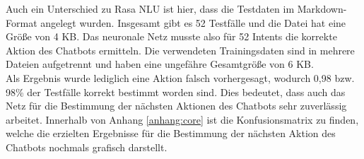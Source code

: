 Auch ein Unterschied zu Rasa NLU ist hier, dass die Testdaten im Markdown-Format angelegt wurden. Insgesamt gibt es 52 Testfälle und die Datei hat eine Größe von 4 KB. Das neuronale Netz musste also für 52 Intents die korrekte Aktion des Chatbots ermitteln. Die verwendeten Trainingsdaten sind in mehrere Dateien aufgetrennt und haben eine ungefähre Gesamtgröße von 6 KB.\\
Als Ergebnis wurde lediglich eine Aktion falsch vorhergesagt, wodurch 0,98 bzw. 98\% der Testfälle korrekt bestimmt worden sind. Dies bedeutet, dass auch das Netz für die Bestimmung der nächsten Aktionen des Chatbots sehr zuverlässig arbeitet. Innerhalb von Anhang \ref{anhang:core} ist die Konfusionsmatrix zu finden, welche die erzielten Ergebnisse für die Bestimmung der nächsten Aktion des Chatbots nochmals grafisch darstellt.
